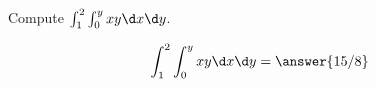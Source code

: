 \documentclass{ximera}
\author{David Guichard \and Neal Koblitz \and H. Jerome Keisler \and Albert Scheller \and Barry Balof \and Mike Wills \and Matthew Carr}
\begin{document}
\begin{exercise}




Compute $\int_{1}^{2}\int_{0}^{y}xy \d x\d y$.
\begin{prompt}
\[
\int_{1}^{2}\int_{0}^{y}xy \d x\d y=\answer{15/8}
\]
\end{prompt}



\end{exercise}
\end{document}
